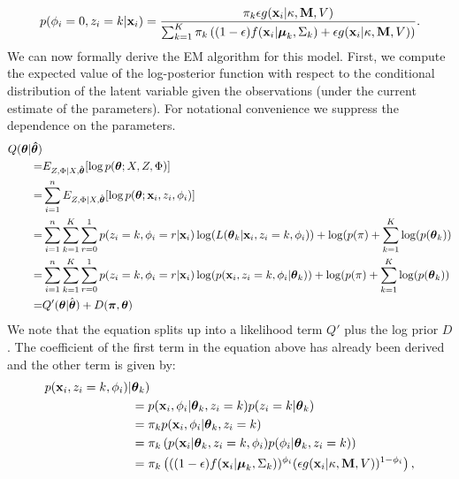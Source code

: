 \documentclass[12pt,english]{article}
\begin{document}
\begin{equation}
p(\phi_i = 0, z_i = k| {\bf x}_i ) = \frac{\pi_k \epsilon g({\bf x}_i|\kappa, {\bf M}, V)}{\sum_{k=1}^{K}\pi_k\left((1-\epsilon) f({\bf x}_i|\boldsymbol{\mu}_k, \Sigma_k) + \epsilon g({\bf x}_i|\kappa, {\bf M}, V)\right)}.
\end{equation}
We can now formally derive the EM algorithm for this model. First, we compute the expected value of the log-posterior function with respect to the conditional distribution of the latent variable given the observations (under the current estimate of the parameters). For notational convenience we suppress the dependence on the parameters.
\begin{equation}
\begin{split}
Q(\boldsymbol{\theta}| \boldsymbol{\hat{\theta}}) & \\
= & E_{Z,\Phi|X, \hat{\boldsymbol{\theta}}}[\log p(\boldsymbol{\theta};X,Z,\Phi)] \\
= & \sum_{i=1}^{n} E_{Z,\Phi|X, \hat{\boldsymbol{\theta}}}[\log p(\boldsymbol{\theta}; {\bf x}_i,z_i,\phi_i)] \\
= & \sum_{i=1}^{n} \sum_{k=1}^{K}\sum_{r = 0}^{1}p(z_i = k, \phi_i = r|{\bf x}_i) \log(L(\boldsymbol{\theta}_k|{\bf x}_i, z_i = k, \phi_i))  + \log(p(\pi) + \sum_{k=1}^{K}\log(p(\boldsymbol{\theta}_k))\\
= & \sum_{i=1}^{n} \sum_{k=1}^{K}\sum_{r = 0}^{1}p(z_i = k, \phi_i = r|{\bf x}_i) \log(p({\bf x}_i, z_i = k , \phi_i|\boldsymbol{\theta}_k))  + \log(p(\pi) + \sum_{k=1}^{K}\log(p(\boldsymbol{\theta}_k))\\
= & Q'(\boldsymbol{\theta}| \hat{\boldsymbol{\theta}}) + D(\boldsymbol{\pi},\boldsymbol{\theta})
\end{split}
\end{equation}
We note that the equation splits up into a likelihood term $Q'$ plus the log prior $D$. The coefficient of the first term in the equation above has already been derived and the other term is given by:
\begin{equation}
\begin{split}
p({\bf x}_i, z_i = k , \phi_i)|&\boldsymbol{\theta}_k) \\
&=  p({\bf x}_i,\phi_i|\boldsymbol{\theta}_k,z_i=k)p(z_i=k|\boldsymbol{\theta}_k) \\
 & = \pi_k p({\bf x}_i,\phi_i|\boldsymbol{\theta}_k,z_i=k)\\
 & =\pi_k \left(p({\bf x}_i|\boldsymbol{\theta}_k,z_i=k, \phi_i)p(\phi_i|\boldsymbol{\theta}_k,z_i=k)\right)\\
 & = \pi_k \left(((1 - \epsilon)f({\bf x}_i|\boldsymbol{\mu}_k, \Sigma_k))^{\phi_i}(\epsilon g({\bf x}_i|\kappa, {\bf M}, V))^{1-\phi_i}\right),
\end{split}
\end{equation}
\end{document}
